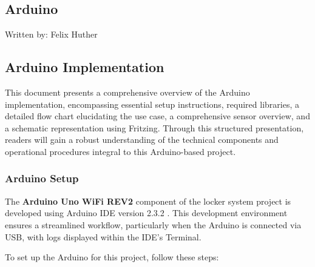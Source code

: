 \subsection{Arduino}
{\tiny Written by: Felix Huther}

\subsection{Arduino Implementation}

This document presents a comprehensive overview of the Arduino implementation, encompassing essential setup instructions, required libraries, a detailed flow chart elucidating the use case, a comprehensive sensor overview, and a schematic representation using Fritzing. Through this structured presentation, readers will gain a robust understanding of the technical components and operational procedures integral to this Arduino-based project.

\subsubsection{Arduino Setup}

The \textbf{Arduino Uno WiFi REV2} \cite{arduino_uno_wifi_rev2} component of the locker system project is developed using Arduino IDE version 2.3.2 \cite{arduino-software}. This development environment ensures a streamlined workflow, particularly when the Arduino is connected via USB, with logs displayed within the IDE's Terminal.

To set up the Arduino for this project, follow these steps:

